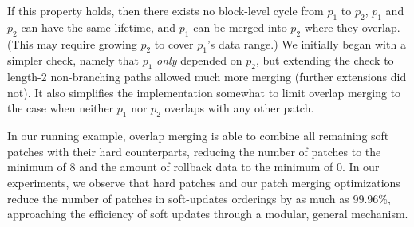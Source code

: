 \noindent
%
If this property holds, then there exists no block-level cycle from $p_1$
to $p_2$, $p_1$ and $p_2$ can have the same lifetime, and $p_1$ can be
merged into $p_2$ where they overlap.
%
(This may require growing $p_2$ to cover $p_1$'s data range.)
%
We initially began with a simpler check, namely that $p_1$ \emph{only}
depended on $p_2$, but extending the check to length-2 non-branching paths
allowed much more merging (further extensions did not).
%
It also simplifies the implementation somewhat to limit overlap merging to
the case when neither $p_1$ nor $p_2$ overlaps with any other patch.



In our running example, overlap merging is able to combine all remaining
soft patches with their hard counterparts, reducing the number of patches
to the minimum of 8 and the amount of rollback data to the minimum of 0.
%
In our experiments, we observe that hard patches and our patch merging
optimizations reduce the number of patches in soft-updates orderings by as
much as 99.96\%, approaching the efficiency of soft updates through a
modular, general mechanism.


\begin{comment}
%
If the only dependency between $p_1$ and $p_2$ is direct---that is, no path
$p_1 \PDepend x \PDepend p_2$ exists for any $x \not\in \{p_1,
p_2\}$---then it will always be possible to write $p_1$ and $p_2$ at the
same time.
%
Specifically, it is possible to write $p_1$ 


Many of these and similar \chdescs\ are mergeable and have
dependencies that allow simple (and fast) reasoning to identify many
of the mergeable pairs: two \chdescs\ on block $b$ that overlap no other \chdescs\ in \PMem[b]
and which have no dependency path from the new to the existing \chdesc\
will not induce a block-level cycle and so are writable together.
We know that \textit{later} changes will not cause them to induce a block-level cycle due to
invariant~\ref{cdinvar:add-before} and by not merging if the new \chdesc\
has a before and the before is marked as allowed to violate
invariant~\ref{cdinvar:add-before}.
%
While path existence testing is expensive, a conservative path test
of only a depth of two identifies most mergeable \chdescs. If the new
\chdesc\ has an explicit \before\ that is not the existing \chdesc\ and
this \before\ has a \before, then there may be a path to the existing
\chdesc.
%
To merge two such overlapping \chdescs, add the new \chdesc's explicit
before to the existing \chdesc\ (if any and if not the existing \chdesc).



At the end of \chdesc\ optimizations, say something along the lines:
%
The dynamic optimizations facilitated through \nrb\
\chdescs\ implement the efficiency in systems using soft updates or
journaling\todo{Actually do this for journaling} while expressing
changes modularly through structural descriptions rather than through
internal and semantic file system descriptions.

\todo{Should we talk about why we allow NRBs and merging to be
  disabled? (Debugging simplicity and depend add to \noop\ \chdescs\
  with \afters\ bug catching.)}
\end{comment}
